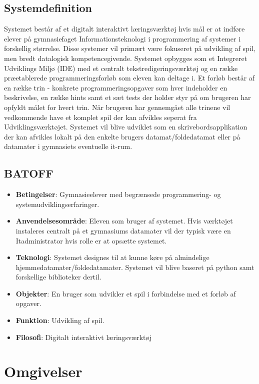 \documentclass[10pt,a4paper,danish]{article}
\begin{document}
\subsection{Systemdefinition}
Systemet består af et digitalt interaktivt læringsværktøj hvis mål er at indføre elever på gymnasiefaget Informationsteknologi i programmering af systemer i forskellig størrelse. Disse systemer vil primært være fokuseret på udvikling af spil, men bredt datalogisk kompetencegivende. Systemet opbygges som et Integreret Udviklings Miljø (IDE) med et centralt tekstredigeringsværktøj og en række præetablerede programmeringsforløb som eleven kan deltage i. Et forløb består af en række trin - konkrete programmeringsopgaver som hver indeholder en beskrivelse, en række hints samt et sæt tests der holder styr på om brugeren har opfyldt målet for hvert trin. Når brugeren har gennemgået alle trinene vil vedkommende have et komplet spil der kan afvikles seperat fra Udviklingsværktøjet. Systemet vil blive udviklet som en skrivebordsapplikation der kan afvikles lokalt på den enkelte brugers datamat/foldedatamat eller på datamater i gymnasiets eventuelle it-rum.

\subsection{BATOFF}
\begin{itemize}
\item \textbf{Betingelser}: Gymnasieelever med begrænsede programmering- og systemudviklingserfaringer. 
\item \textbf{Anvendelsesområde}: Eleven som bruger af systemet. Hvis værktøjet instaleres centralt på et
gymnasiums datamater vil der typisk være en Itadministrator hvis rolle er at opsætte systemet.
\item \textbf{Teknologi}: Systemet designes til at kunne køre på almindelige hjemmedatamater/foldedatamater.
Systemet vil blive baseret på python samt forskellige biblioteker dertil.
\item \textbf{Objekter}: En bruger som udvikler et spil i forbindelse med et forløb af opgaver. 
\item \textbf{Funktion}: Udvikling af spil.
\item \textbf{Filosofi}:  Digitalt interaktivt læringsværktøj
\end{itemize}

\section{Omgivelser}
\end{document}
